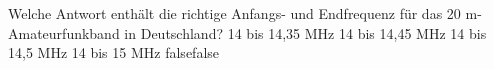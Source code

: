     {Welche Antwort enthält die richtige Anfangs- und Endfrequenz für das 20 m-Amateurfunkband in Deutschland?}
    {14 bis 14,35 MHz}
    {14 bis 14,45 MHz}
    {14 bis 14,5 MHz}
    {14 bis 15 MHz}
    {false}{false}